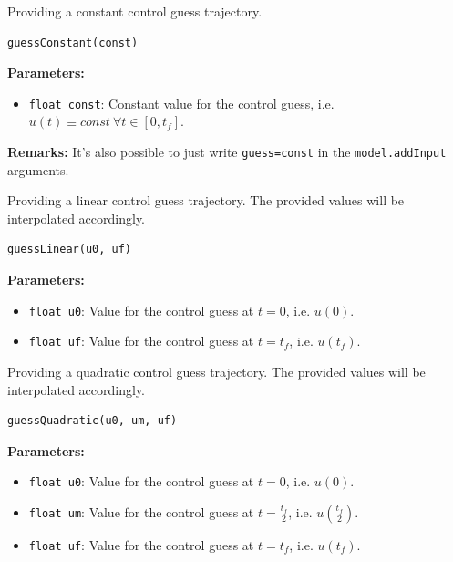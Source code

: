 \documentclass[12pt]{article}
\begin{document}
\begin{mdframed}[backgroundcolor=gray!10, roundcorner=10pt, linewidth=1pt]
	
	Providing a constant control guess trajectory.

	\begin{lstlisting}
guessConstant(const)
	\end{lstlisting}
	
	\textbf{Parameters:}
	\begin{itemize}
		\item \texttt{float const}: Constant value for the control guess, i.e. $u(t) \equiv const ~ \forall t \in [0, t_f]$.
	\end{itemize}
	
	\textbf{Remarks:} It's also possible to just write \texttt{guess=const} in the \texttt{model.addInput} arguments.
\end{mdframed}

\begin{mdframed}[backgroundcolor=gray!10, roundcorner=10pt, linewidth=1pt]
	
	Providing a linear control guess trajectory. The provided values will be interpolated accordingly.
	
		\begin{lstlisting}
guessLinear(u0, uf)
	\end{lstlisting}
	
	\textbf{Parameters:}
	\begin{itemize}
		\item \texttt{float u0}: Value for the control guess at $t=0$, i.e. $u(0)$.
		\item \texttt{float uf}: Value for the control guess at $t=t_f$, i.e. $u(t_f)$.
	\end{itemize}

\end{mdframed}

\begin{mdframed}[backgroundcolor=gray!10, roundcorner=10pt, linewidth=1pt]
	
	Providing a quadratic control guess trajectory. The provided values will be interpolated accordingly.
	
	\begin{lstlisting}
guessQuadratic(u0, um, uf)
	\end{lstlisting}
	
	\textbf{Parameters:}
	\begin{itemize}
		\item \texttt{float u0}: Value for the control guess at $t=0$, i.e. $u(0)$.
		\item \texttt{float um}: Value for the control guess at $t=\frac{t_f}{2}$, i.e. $u(\frac{t_f}{2})$.
		\item \texttt{float uf}: Value for the control guess at $t=t_f$, i.e. $u(t_f)$.
	\end{itemize}
	
\end{mdframed}
\end{document}
